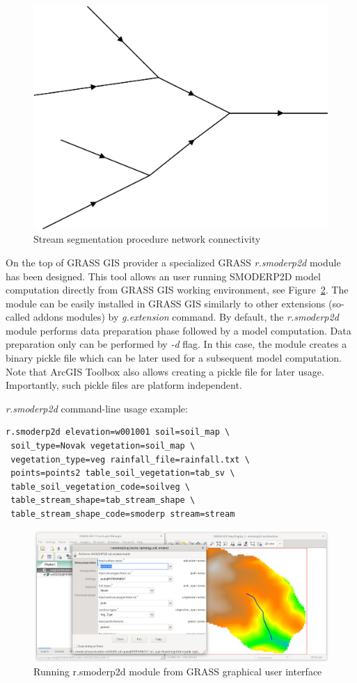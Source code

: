 \begin{figure}[ht!]
  \begin{center}
    \includegraphics[width=0.6\columnwidth]{figures/stream_next_edge}
    \caption{Stream segmentation procedure network connectivity}
    \label{fig:stream_next_edge}
  \end{center}
\end{figure}

On the top of GRASS GIS provider a specialized GRASS {\em r.smoderp2d}
module has been designed. This tool allows an user running SMODERP2D
model computation directly from GRASS GIS working environment, see
Figure~\ref{fig:r.smoderp2d}. The module can be easily installed in
GRASS GIS similarly to other extensions (so-called addons modules) by
{\em g.extension} command. By default, the {\em r.smoderp2d} module
performs data preparation phase followed by a model computation. Data
preparation only can be performed by {\em -d} flag. In this case, the
module creates a binary pickle file which can be later used for a
subsequent model computation. Note that ArcGIS Toolbox also allows
creating a pickle file for later usage. Importantly, such pickle files
are platform independent.

{\em r.smoderp2d} command-line usage example:
\begin{verbatim}
r.smoderp2d elevation=w001001 soil=soil_map \
 soil_type=Novak vegetation=soil_map \
 vegetation_type=veg rainfall_file=rainfall.txt \
 points=points2 table_soil_vegetation=tab_sv \
 table_soil_vegetation_code=soilveg \
 table_stream_shape=tab_stream_shape \
 table_stream_shape_code=smoderp stream=stream 
\end{verbatim}

\begin{figure}[ht!]
  \begin{center}
    \includegraphics[width=1.0\columnwidth]{figures/smoderp2d_grass.png}
    \caption{Running r.smoderp2d module from GRASS graphical user interface}
    \label{fig:r.smoderp2d}
  \end{center}
\end{figure}

